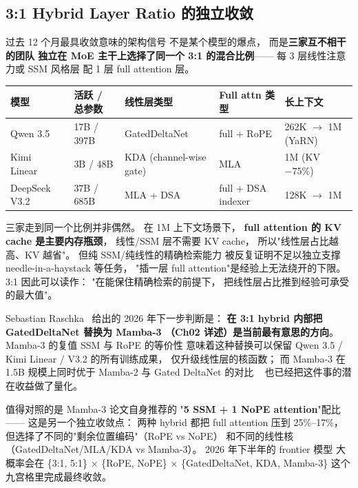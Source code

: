 \subsection{3:1 Hybrid Layer Ratio 的独立收敛}
\label{sec:moe-3to1-hybrid}

过去 12 个月最具收敛意味的架构信号
不是某个模型的爆点，
而是\textbf{三家互不相干的团队
独立在 MoE 主干上选择了同一个 3:1 的混合比例}——
每 3 层线性注意力或 SSM 风格层
配 1 层 full attention 层。

\begin{center}\small
\renewcommand{\arraystretch}{1.3}
\begin{tabular}{lllll}
  \toprule
  \rowcolor{figLightGray}
  \textbf{模型} & \textbf{活跃 / 总参数} & \textbf{线性层类型}
  & \textbf{Full attn 类型} & \textbf{长上下文} \\
  \midrule
  Qwen 3.5~\cite{qwen35hybrid2026} & 17B / 397B & GatedDeltaNet
  & full + RoPE & 262K $\to$ 1M (YaRN) \\
  Kimi Linear~\cite{kimilinear2025} & 3B / 48B & KDA (channel-wise gate)
  & MLA & 1M (KV $-75\%$) \\
  DeepSeek V3.2~\cite{deepseekv322025} & 37B / 685B & MLA + DSA
  & full + DSA indexer & 128K $\to$ 1M \\
  \bottomrule
\end{tabular}
\end{center}

三家走到同一个比例并非偶然。
在 1M 上下文场景下，
\textbf{full attention 的 KV cache 是主要内存瓶颈}，
线性/SSM 层不需要 KV cache，
所以"线性层占比越高、KV 越省"。
但纯 SSM/纯线性的精确检索能力
被反复证明不足以独立支撑 needle-in-a-haystack 等任务，
"插一层 full attention"是经验上无法绕开的下限。
3:1 因此可以读作：
"在能保住精确检索的前提下，
把线性层占比推到经验可承受的最大值"。

Sebastian Raschka~\cite{raschka2026hybridcommentary} 给出的
2026 年下一步判断是：
\textbf{在 3:1 hybrid 内部把 GatedDeltaNet 替换为 Mamba-3
（Ch02 详述）是当前最有意思的方向}。
Mamba-3 的复值 SSM 与 RoPE 的等价性
意味着这种替换可以保留 Qwen 3.5 / Kimi Linear / V3.2
的所有训练成果，
仅升级线性层的核函数；
而 Mamba-3 在 1.5B 规模上同时优于
Mamba-2 与 Gated DeltaNet 的对比
~\cite{mamba32026,mamba3hybridtogether2026}
也已经把这件事的潜在收益做了量化。

值得对照的是 Mamba-3 论文自身推荐的
"\textbf{5 SSM + 1 NoPE attention}"配比——
这是另一个独立收敛点：
两种 hybrid 都把 full attention 压到 25\%--17\%，
但选择了不同的"剩余位置编码"（RoPE vs NoPE）
和不同的线性核（GatedDeltaNet/MLA/KDA vs Mamba-3）。
2026 年下半年的 frontier 模型
大概率会在 \{3:1, 5:1\} $\times$ \{RoPE, NoPE\}
$\times$ \{GatedDeltaNet, KDA, Mamba-3\}
这个九宫格里完成最终收敛。

